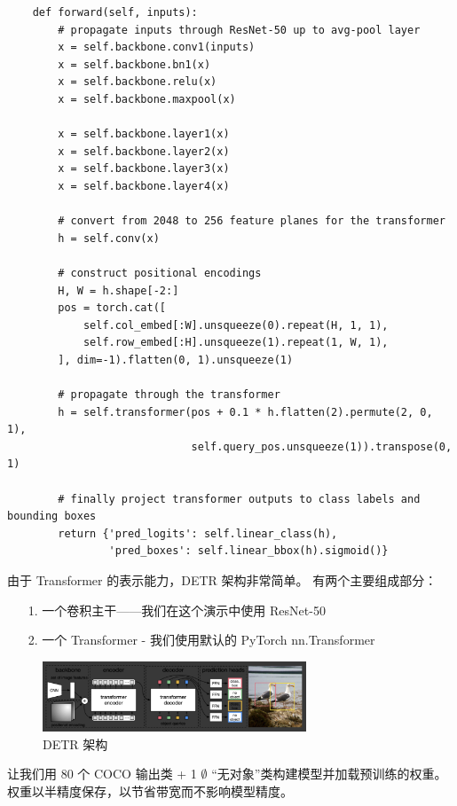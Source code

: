 \begin{Verbatim}
    def forward(self, inputs):
        # propagate inputs through ResNet-50 up to avg-pool layer
        x = self.backbone.conv1(inputs)
        x = self.backbone.bn1(x)
        x = self.backbone.relu(x)
        x = self.backbone.maxpool(x)

        x = self.backbone.layer1(x)
        x = self.backbone.layer2(x)
        x = self.backbone.layer3(x)
        x = self.backbone.layer4(x)

        # convert from 2048 to 256 feature planes for the transformer
        h = self.conv(x)

        # construct positional encodings
        H, W = h.shape[-2:]
        pos = torch.cat([
            self.col_embed[:W].unsqueeze(0).repeat(H, 1, 1),
            self.row_embed[:H].unsqueeze(1).repeat(1, W, 1),
        ], dim=-1).flatten(0, 1).unsqueeze(1)

        # propagate through the transformer
        h = self.transformer(pos + 0.1 * h.flatten(2).permute(2, 0, 1),
                             self.query_pos.unsqueeze(1)).transpose(0, 1)
        
        # finally project transformer outputs to class labels and bounding boxes
        return {'pred_logits': self.linear_class(h), 
                'pred_boxes': self.linear_bbox(h).sigmoid()}
\end{Verbatim}


由于 Transformer 的表示能力，DETR 架构非常简单。 有两个主要组成部分：

\begin{itemize}
\item [1.] 一个卷积主干——我们在这个演示中使用 ResNet-50
\item [2.] 一个 Transformer - 我们使用默认的 PyTorch nn.Transformer
\end{itemize}

\begin{figure}[htb]
\centering 
\includegraphics[width=0.7\textwidth]{img/c4d2.png} 
\caption{DETR 架构}
\label{Test}
\end{figure}

让我们用 80 个 COCO 输出类 + 1 $\emptyset$ “无对象”类构建模型并加载预训练的权重。 权重以半精度保存，以节省带宽而不影响模型精度。

